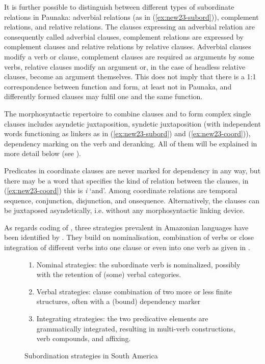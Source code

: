 It is further possible to distinguish between different types of subordinate relations in Paunaka: adverbial relations (as in (\ref{ex:new23-subord})), complement relations, and relative relations. The clauses expressing an adverbial relation are consequently called adverbial claus\-es, complement relations are expressed by complement clauses and relative relations by relative clauses. Adverbial clauses modify a verb or clause, complement clauses are required as arguments by some verbs, relative clauses modify an argument or, in the case of headless relative clauses, become an argument themselves. This does not imply that there is a 1:1 correspondence between function and form, at least not in Paunaka, and differently formed clauses may fulfil one and the same function.

The morphosyntactic repertoire to combine clauses and to form complex single clauses includes asyndetic juxtaposition, syndetic juxtaposition (with independent words functioning as linkers as in (\ref{ex:new23-subord}) and (\ref{ex:new23-coord})), dependency marking on the verb and deranking. All of them will be explained in more detail below (see ).

Predicates in coordinate clauses are never marked for dependency in any way, but there may be a  word that specifies the kind of relation between the clauses, in (\ref{ex:new23-coord}) this is \textit{i} ‘and’. Among coordinate relations are temporal sequence, conjunction, disjunction,  and onsequence. Alternatively, the clauses can be juxtaposed asyndetically, i.e. without any morphosyntactic linking device.

As regards coding of , three strategies prevalent in Amazonian languages have been identified by \citet[10]{Gijnetal2011}. They build on nominalisation, combination of verbs or close integration of different verbs into one clause or even into one verb as given in .


\begin{figure}[!ht]

\begin{enumerate}
\item Nominal strategies: the subordinate verb is nominalized, possibly with the retention of (some) verbal categories.
\item Verbal strategies: clause combination of two more or less finite structures, often with a (bound) dependency marker
\item Integrating strategies: the two predicative elements are grammatically integrated, resulting in multi-verb constructions, verb compounds, and affixing.
\end{enumerate}
\caption{Subordination strategies in South America \citep[10]{Gijnetal2011}}
\label{fig:SubordinationSouthAmerica}

\end{figure}


